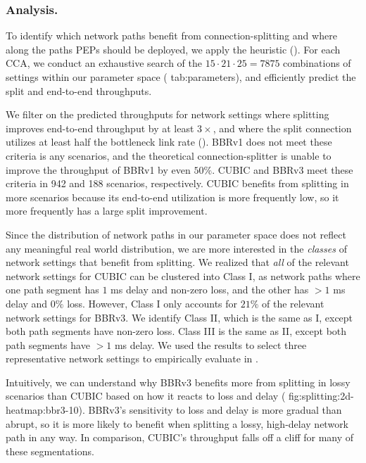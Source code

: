 \subsubsection{Analysis.}
To identify which network paths benefit from connection-splitting and where
along the paths PEPs should be deployed, we apply the
heuristic ().
For each CCA, we conduct an exhaustive search of the $15 \cdot 21 \cdot 25 =
7875$ combinations of settings within our parameter space (\Cref
{tab:parameters}), and efficiently predict the split and end-to-end throughputs.

We filter on the predicted throughputs for network settings where splitting improves end-to-end throughput by
at least $3\times$, and where the split connection utilizes at least half the
bottleneck link rate (). BBRv1 does not meet
these criteria is any scenarios, and the theoretical connection-splitter is
unable to improve the throughput of BBRv1 by even $50\%$. CUBIC and BBRv3 meet
these criteria in 942 and 188 scenarios, respectively. CUBIC benefits from
splitting in more scenarios because its end-to-end utilization is more
frequently low, so it more frequently has a large split improvement.



Since the distribution of network paths in our parameter space does not reflect
any meaningful real world distribution, we are more interested in the \textit
{classes} of network settings that benefit from splitting. We realized
that \textit{all} of the relevant network settings for CUBIC can be clustered
into Class I, as network paths where one path segment has $1$ ms delay and
non-zero loss, and the other has $>1$ ms delay and $0\%$ loss. However, Class
I only accounts for $21\%$ of the relevant network settings for BBRv3. We
identify Class II, which is the same as I, except both path segments have
non-zero loss. Class III is the same as II, except both path segments have
$>1$ ms delay. We used the results to select three representative network
settings to empirically evaluate in .

Intuitively, we can understand why BBRv3 benefits more from splitting in lossy
scenarios than CUBIC based on how it reacts to loss and delay (\Cref
{fig:splitting:2d-heatmap:bbr3-10}). BBRv3's sensitivity to loss
and delay is more gradual than abrupt, so it is more likely to benefit when
splitting a lossy, high-delay network path in any way. In comparison, CUBIC's
throughput falls off a cliff for many of these segmentations.

